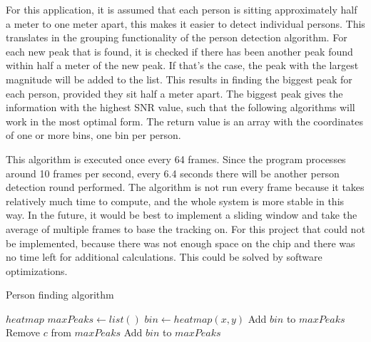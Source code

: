 For this application, it is assumed that each person is sitting approximately half a meter to one meter apart, this makes it easier to detect individual persons. This translates in the grouping functionality of the person detection algorithm. For each new peak that is found, it is checked if there has been another peak found within half a meter of the new peak. If that's the case, the peak with the largest magnitude will be added to the list. This results in finding the biggest peak for each person, provided they sit half a meter apart. The biggest peak gives the information with the highest SNR value, such that the following algorithms will work in the most optimal form. The return value is an array with the coordinates of one or more bins, one bin per person.

This algorithm is executed once every 64 frames. Since the program processes around 10 frames per second, every 6.4 seconds there will be another person detection round performed. The algorithm is not run every frame because it takes relatively much time to compute, and the whole system is more stable in this way. In the future, it would be best to implement a sliding window and take the average of multiple frames to base the tracking on. For this project that could not be implemented, because there was not enough space on the chip and there was no time left for additional calculations. This could be solved by software optimizations.

\begin{algorithm}
\caption{Person finding algorithm}\label{alg:person_finding_algorithm}
\begin{algorithmic}
\Require $heatmap$
\State $maxPeaks \gets list()$
        \State $bin \gets heatmap(x, y)$
                        \State Add $bin$ to $maxPeaks$
                        \State Remove $c$ from $maxPeaks$
                    \EndIf
                \Else
                    \State Add $bin$ to $maxPeaks$
                \EndIf
            \EndIf
        \EndIf
    \EndFor
\EndFor
\end{algorithmic}
\end{algorithm}

